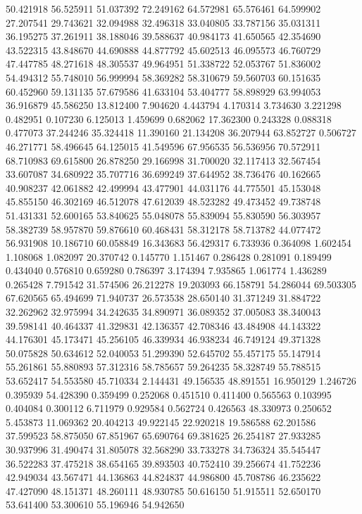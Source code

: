 50.421918
56.525911
51.037392
72.249162
64.572981
65.576461
64.599902
27.207541
29.743621
32.094988
32.496318
33.040805
33.787156
35.031311
36.195275
37.261911
38.188046
39.588637
40.984173
41.650565
42.354690
43.522315
43.848670
44.690888
44.877792
45.602513
46.095573
46.760729
47.447785
48.271618
48.305537
49.964951
51.338722
52.053767
51.836002
54.494312
55.748010
56.999994
58.369282
58.310679
59.560703
60.151635
60.452960
59.131135
57.679586
41.633104
53.404777
58.898929
63.994053
36.916879
45.586250
13.812400
7.904620
4.443794
4.170314
3.734630
3.221298
0.482951
0.107230
6.125013
1.459699
0.682062
17.362300
0.243328
0.088318
0.477073
37.244246
35.324418
11.390160
21.134208
36.207944
63.852727
0.506727
46.271771
58.496645
64.125015
41.549596
67.956535
56.536956
70.572911
68.710983
69.615800
26.878250
29.166998
31.700020
32.117413
32.567454
33.607087
34.680922
35.707716
36.699249
37.644952
38.736476
40.162665
40.908237
42.061882
42.499994
43.477901
44.031176
44.775501
45.153048
45.855150
46.302169
46.512078
47.612039
48.523282
49.473452
49.738748
51.431331
52.600165
53.840625
55.048078
55.839094
55.830590
56.303957
58.382739
58.957870
59.876610
60.468431
58.312178
58.713782
44.077472
56.931908
10.186710
60.058849
16.343683
56.429317
6.733936
0.364098
1.602454
1.108068
1.082097
20.370742
0.145770
1.151467
0.286428
0.281091
0.189499
0.434040
0.576810
0.659280
0.786397
3.174394
7.935865
1.061774
1.436289
0.265428
7.791542
31.574506
26.212278
19.203093
66.158791
54.286044
69.503305
67.620565
65.494699
71.940737
26.573538
28.650140
31.371249
31.884722
32.262962
32.975994
34.242635
34.890971
36.089352
37.005083
38.340043
39.598141
40.464337
41.329831
42.136357
42.708346
43.484908
44.143322
44.176301
45.173471
45.256105
46.339934
46.938234
46.749124
49.371328
50.075828
50.634612
52.040053
51.299390
52.645702
55.457175
55.147914
55.261861
55.880893
57.312316
58.785657
59.264235
58.328749
55.788515
53.652417
54.553580
45.710334
2.144431
49.156535
48.891551
16.950129
1.246726
0.395939
54.428390
0.359499
0.252068
0.451510
0.411400
0.565563
0.103995
0.404084
0.300112
6.711979
0.929584
0.562724
0.426563
48.330973
0.250652
5.453873
11.069362
20.404213
49.922145
22.920218
19.586588
62.201586
37.599523
58.875050
67.851967
65.690764
69.381625
26.254187
27.933285
30.937996
31.490474
31.805078
32.568290
33.733278
34.736324
35.545447
36.522283
37.475218
38.654165
39.893503
40.752410
39.256674
41.752236
42.949034
43.567471
44.136863
44.824837
44.986800
45.708786
46.235622
47.427090
48.151371
48.260111
48.930785
50.616150
51.915511
52.650170
53.641400
53.300610
55.196946
54.942650
